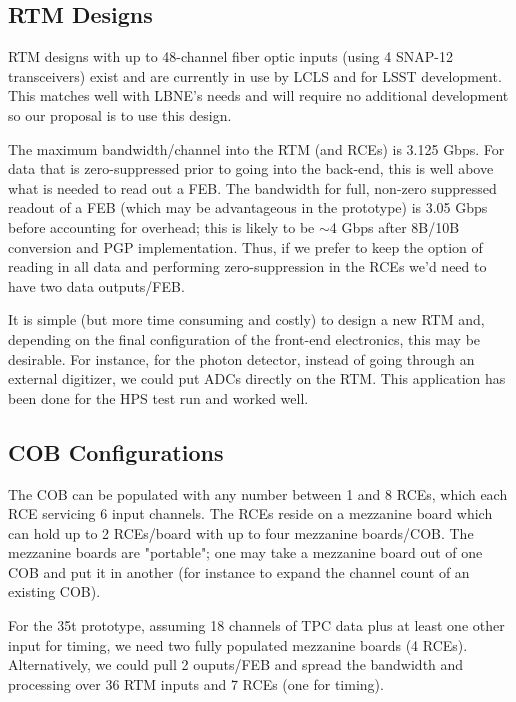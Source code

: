 \subsection{RTM Designs}

RTM designs with up to 48-channel fiber optic inputs (using 4 SNAP-12 transceivers) exist and are currently in use by LCLS and for LSST development. This matches well with LBNE's needs and will require no additional development so our proposal is to use this design.  

The maximum bandwidth/channel into the RTM (and RCEs) is 3.125 Gbps.  For data that is zero-suppressed prior to going into the back-end, this is well above what is needed to read out a FEB.    The bandwidth for full, non-zero suppressed readout of a FEB (which may be advantageous in the prototype) is 3.05 Gbps before accounting for overhead;  this is likely to be $\sim$4 Gbps after 8B/10B conversion and PGP implementation.  Thus, if we prefer to keep the option of reading in all data and performing zero-suppression in the RCEs we'd need to have two data outputs/FEB.   

It is simple (but more time consuming and costly) to design a new RTM and, depending on the final configuration of the front-end electronics, this may be desirable.  For instance, for the photon detector, instead of going through an external digitizer, we could put ADCs directly on the RTM.  This application has been done for the HPS test run and worked well.  


\subsection{COB Configurations}

The COB can be populated with any number between 1 and 8 RCEs, which each RCE servicing 6 input channels.  The RCEs reside on a mezzanine board which can hold up to 2 RCEs/board with up to four mezzanine boards/COB.  The mezzanine boards are "portable"; one may take a mezzanine board out of one COB and put it in another (for instance to expand the channel count of an existing COB).  

For the 35t prototype, assuming 18 channels of TPC data plus at least one other input for timing, we need two fully populated mezzanine boards (4 RCEs).  Alternatively, we could pull 2 ouputs/FEB and spread the bandwidth and processing over 36 RTM inputs and 7 RCEs (one for timing). 


